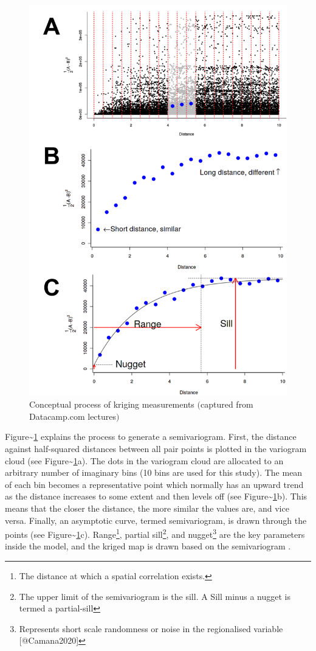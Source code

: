 \begin{figure}[hbt!]
\begin{center} 
  \includegraphics[width=.7\textwidth]{Figures/semivariogram.png}
\end{center} 
\caption[Conceptual process of kriging measurements]{Conceptual process of kriging measurements $($captured from Datacamp.com lectures$)$} 
\label{fig:semivariogram} 
\end{figure}

Figure\textasciitilde{}\ref{fig:semivariogram} explains the process to
generate a semivariogram. First, the distance against half-squared
distances between all pair points is plotted in the variogram cloud (see
Figure\textasciitilde{}\ref{fig:semivariogram}a). The dots in the
variogram cloud are allocated to an arbitrary number of imaginary bins
(10 bins are used for this study). The mean of each bin becomes a
representative point which normally has an upward trend as the distance
increases to some extent and then levels off (see
Figure\textasciitilde{}\ref{fig:semivariogram}b). This means that the
closer the distance, the more similar the values are, and vice versa.
Finally, an asymptotic curve, termed semivariogram, is drawn through the
points (see Figure\textasciitilde{}\ref{fig:semivariogram}c).
Range\footnote{The distance at which a spatial correlation exists.},
partial
sill\footnote{The upper limit of the semivariogram is the sill. A Sill minus a nugget is termed a partial-sill},
and
nugget\footnote{Represents short scale randomness or noise in the regionalised variable [@Camana2020]}
are the key parameters inside the model, and the kriged map is drawn
based on the semivariogram \citep{Law2019}.

